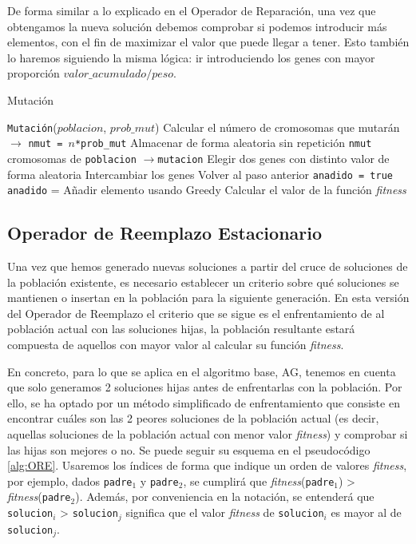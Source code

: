 De forma similar a lo explicado en el Operador de Reparación, una vez que obtengamos la nueva solución debemos comprobar si podemos introducir más elementos, con el fin de maximizar el valor que puede llegar a tener. 
Esto también lo haremos siguiendo la misma lógica: ir introduciendo los genes con mayor proporción $valor\_acumulado/peso$.

\begin{algorithm}[H]
\caption{Mutación}\label{alg:Mutation}
\begin{algorithmic}[1]
\Procedure \texttt{Mutación}($poblacion$, $prob\_mut$)
\State Calcular el número de cromosomas que mutarán $\xrightarrow{}{}$ \texttt{nmut = $n$*prob\_mut}
\State Almacenar de forma aleatoria sin repetición \texttt{nmut} cromosomas de \texttt{poblacion} $\xrightarrow{}{}$\texttt{mutacion}
	\State Elegir dos genes con distinto valor de forma aleatoria
		\State Intercambiar los genes
	\Else
		\State Volver al paso anterior
	\EndIf
	\State \texttt{anadido = true} 
		\State \texttt{anadido} = Añadir elemento usando Greedy
	\EndWhile
	\State Calcular el valor de la función \textit{fitness}
\EndFor
\EndProcedure
\end{algorithmic}
\end{algorithm}

\subsection{Operador de Reemplazo Estacionario}

Una vez que hemos generado nuevas soluciones a partir del cruce de soluciones de la población existente, es necesario establecer un criterio sobre qué soluciones se mantienen o insertan en la población para la siguiente generación. 
En esta versión del Operador de Reemplazo el criterio que se sigue es el enfrentamiento de al población actual con las soluciones hijas, la población resultante estará compuesta de aquellos con mayor valor al calcular su función \textit{fitness}. 

En concreto, para lo que se aplica en el algoritmo base, AG, tenemos en cuenta que solo generamos 2 soluciones hijas antes de enfrentarlas con la población. 
Por ello, se ha optado por un método simplificado de enfrentamiento que consiste en encontrar cuáles son las 2 peores soluciones de la población actual (es decir, aquellas soluciones de la población actual con menor valor \textit{fitness}) y comprobar si las hijas son mejores o no. 
Se puede seguir su esquema en el pseudocódigo \ref{alg:ORE}. 
Usaremos los índices de forma que indique un orden de valores \textit{fitness}, por ejemplo, dados \texttt{padre$_1$} y  \texttt{padre$_2$}, se cumplirá que \textit{fitness}(\texttt{padre$_1$}) > \textit{fitness}(\texttt{padre$_2$}). 
Además, por conveniencia en la notación, se entenderá que \texttt{solucion$_i$} > \texttt{solucion$_j$} significa que el valor \textit{fitness} de \texttt{solucion$_i$} es mayor al de \texttt{solucion$_j$}.


